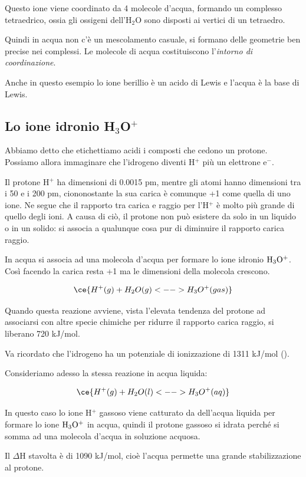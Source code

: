 Questo ione viene coordinato da 4 molecole d'acqua, formando un complesso tetraedrico, ossia gli ossigeni dell'H$_2$O sono disposti ai vertici di un tetraedro.

Quindi in acqua non c'è un mescolamento casuale, si formano delle geometrie ben precise nei complessi. Le molecole di acqua costituiscono l'\textit{intorno di coordinazione}.

Anche in questo esempio lo ione berillio è un acido di Lewis e l'acqua è la base di Lewis.

\subsection{Lo ione idronio H$_3$O$^+$}
Abbiamo detto che etichettiamo acidi i composti che cedono un protone. Possiamo allora immaginare che l'idrogeno diventi H$^+$ più un elettrone e$^-$.

Il protone H$^+$ ha dimensioni di 0.0015 pm, mentre gli atomi hanno dimensioni tra i 50 e i 200 pm, ciononostante la sua carica è comunque +1 come quella di uno ione. Ne segue che il rapporto tra carica e raggio per l'H$^+$ è molto più grande di quello degli ioni. A causa di ciò, il protone non può esistere da solo in un liquido o in un solido: si associa a qualunque cosa pur di diminuire il rapporto carica raggio.

In acqua si associa ad una molecola d'acqua per formare lo ione idronio $\rm H_3O^+$. Così facendo la carica resta +1 ma le dimensioni della molecola crescono.

$$\ce{H^+(g) + H_2O(g) <--> H_3O^+(gas)}$$

Quando questa reazione avviene, vista l'elevata tendenza del protone ad associarsi con altre specie chimiche per ridurre il rapporto carica raggio, si liberano 720 kJ/mol.

Va ricordato che l'idrogeno ha un potenziale di ionizzazione di 1311 kJ/mol ().

\vspace{0.2cm}Consideriamo adesso la stessa reazione in acqua liquida:

$$\ce{H^+(g) + H_2O(l) <--> H_3O^+(aq)}$$

In questo caso lo ione H$^+$ gassoso viene catturato da dell'acqua liquida per formare lo ione $\rm H_3O^+$ in acqua, quindi il protone gassoso si idrata perché si somma ad una molecola d'acqua in soluzione acquosa.

Il $\Delta$H stavolta è di 1090 kJ/mol, cioè l'acqua permette una grande stabilizzazione al protone.

